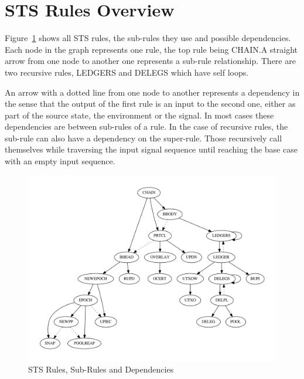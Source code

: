 \section{STS Rules Overview}
\label{sec:sts-rules-overview}

Figure~\ref{fig:sts-rules-dependencies} shows all STS rules, the sub-rules they
use and possible dependencies. Each node in the graph represents one rule, the
top rule being CHAIN.\@ A straight arrow from one node to another one represents
a sub-rule relationship. There are two recursive rules, LEDGERS and DELEGS which
have self loops.

An arrow with a dotted line from one node to another represents a dependency in
the sense that the output of the first rule is an input to the second one,
either as part of the source state, the environment or the signal. In most cases
these dependencies are between sub-rules of a rule. In the case of recursive
rules, the sub-rule can also have a dependency on the super-rule. Those
recursively call themselves while traversing the input signal sequence until
reaching the base case with an empty input sequence.

\begin{figure}[htp]
  \centering
  \includegraphics[width=\textwidth]{rules}
  \caption{STS Rules, Sub-Rules and Dependencies}
  \label{fig:sts-rules-dependencies}
\end{figure}

